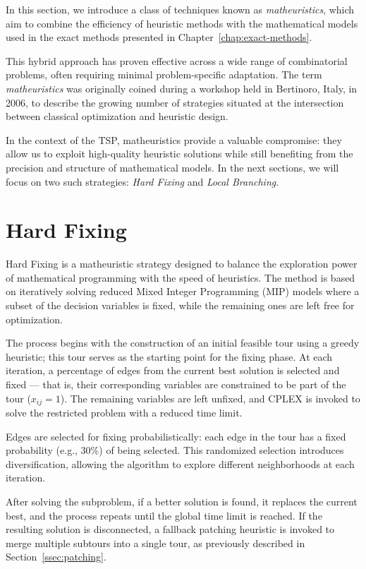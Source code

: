 \label{chap:matheuristics}
In this section, we introduce a class of techniques known as \emph{matheuristics}, which aim to combine the efficiency of heuristic methods with the mathematical models used in the exact methods presented in Chapter~\ref{chap:exact-methods}.

This hybrid approach has proven effective across a wide range of combinatorial problems, often requiring minimal problem-specific adaptation. The term \emph{matheuristics} was originally coined during a workshop held in Bertinoro, Italy, in 2006, to describe the growing number of strategies situated at the intersection between classical optimization and heuristic design.

In the context of the TSP, matheuristics provide a valuable compromise: they allow us to exploit high-quality heuristic solutions while still benefiting from the precision and structure of mathematical models. In the next sections, we will focus on two such strategies: \emph{Hard Fixing} and \emph{Local Branching}.

\section{Hard Fixing}

Hard Fixing is a matheuristic strategy designed to balance the exploration power of mathematical programming with the speed of heuristics. The method is based on iteratively solving reduced Mixed Integer Programming (MIP) models where a subset of the decision variables is fixed, while the remaining ones are left free for optimization.

The process begins with the construction of an initial feasible tour using a greedy heuristic; this tour serves as the starting point for the fixing phase. At each iteration, a percentage of edges from the current best solution is selected and fixed — that is, their corresponding variables are constrained to be part of the tour (\( x_{ij} = 1 \)). The remaining variables are left unfixed, and CPLEX is invoked to solve the restricted problem with a reduced time limit.

Edges are selected for fixing probabilistically: each edge in the tour has a fixed probability (e.g., 30\%) of being selected. This randomized selection introduces diversification, allowing the algorithm to explore different neighborhoods at each iteration.

After solving the subproblem, if a better solution is found, it replaces the current best, and the process repeats until the global time limit is reached. If the resulting solution is disconnected, a fallback patching heuristic is invoked to merge multiple subtours into a single tour, as previously described in Section~\ref{ssec:patching}.

